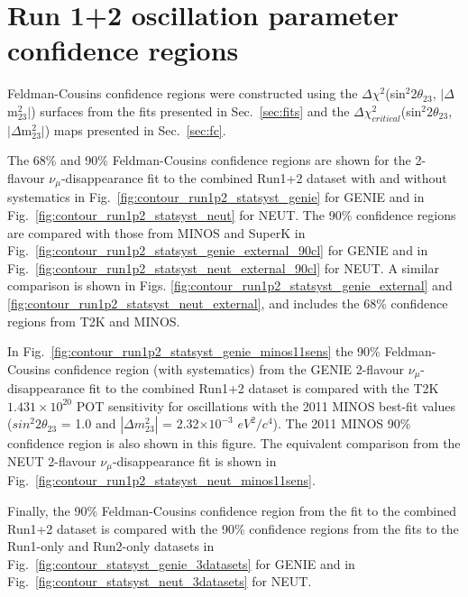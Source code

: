 \clearpage

\section {Run 1+2 oscillation parameter confidence regions }
\label{sec:conf_regions}

Feldman-Cousins confidence regions were constructed using the 
$\Delta\chi^{2}$(sin$^{2}$2$\theta_{23}$, $|\Delta$m$^{2}_{23}|$) surfaces
from the fits presented in Sec.\ \ref{sec:fits} and the
$\Delta\chi^{2}_{critical}$(sin$^{2}$2$\theta_{23}$, $|\Delta$m$^{2}_{23}|$) maps
presented in Sec.\ \ref{sec:fc}.

The 68\% and 90\% Feldman-Cousins confidence regions are shown for the
2-flavour $\nu_{\mu}$-disappearance fit to the combined Run1+2 dataset 
with and without systematics
in Fig.\ \ref{fig:contour_run1p2_statsyst_genie} for GENIE and
in Fig.\ \ref{fig:contour_run1p2_statsyst_neut} for NEUT.
The 90\% confidence regions are compared with those from 
MINOS \cite{Minos2011} and SuperK \cite{OldDisappSuperK}
in Fig.\ \ref{fig:contour_run1p2_statsyst_genie_external_90cl} for GENIE and
in Fig.\ \ref{fig:contour_run1p2_statsyst_neut_external_90cl} for NEUT.
A similar comparison is shown in Figs.
\ref{fig:contour_run1p2_statsyst_genie_external} and
\ref{fig:contour_run1p2_statsyst_neut_external}, and
includes the 68\% confidence regions from T2K and MINOS.

In Fig.\ \ref{fig:contour_run1p2_statsyst_genie_minos11sens}
the 90\% Feldman-Cousins confidence region (with systematics) from the GENIE
2-flavour $\nu_{\mu}$-disappearance fit to the combined Run1+2 dataset 
is compared with the T2K $1.431 \times 10^{20}$ POT sensitivity for oscillations
with the 2011 MINOS best-fit values
($sin^{2}2\theta_{23}$ = 1.0 and $|\Delta m^{2}_{23}|$ = 2.32$\times10^{-3}$ $eV^{2}/c^{4}$).
The 2011 MINOS 90\% confidence region is also shown in this figure.
The equivalent comparison from the NEUT 2-flavour $\nu_{\mu}$-disappearance fit is shown in 
Fig.\ \ref{fig:contour_run1p2_statsyst_neut_minos11sens}.

Finally, the 90\% Feldman-Cousins confidence region from the fit to the combined Run1+2 dataset
is compared with the 90\% confidence regions from the fits to the Run1-only and Run2-only datasets 
in Fig.\ \ref{fig:contour_statsyst_genie_3datasets} for GENIE and
in Fig.\ \ref{fig:contour_statsyst_neut_3datasets} for NEUT.

%
%

